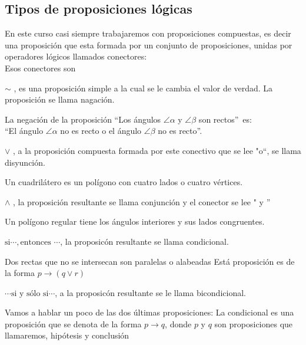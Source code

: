 \subsection{Tipos de proposiciones lógicas}
En este curso casi siempre trabajaremos con proposiciones compuestas, es decir
una proposici\'on que esta formada por un conjunto de proposiciones, unidas por
operadores l\'ogicos llamados conectores:\\ Esos conectores son
\begin{lista}
\item $\sim$ , es una proposici\'on simple a la cual se le cambia el valor de
verdad. La proposici\'on se llama nagaci\'on.
\setlength{\parindent}{-25pt}
\begin{ejemplo}{La negación de la proposición \textquotedblleft Los ángulos
$\angle\alpha$ y $\angle\beta$ son rectos\textquotedblright\, es:\\
\textquotedblleft El ángulo $\angle\alpha$ no es recto o el ángulo
$\angle\beta$ no es recto\textquotedblright.}
\end{ejemplo}
 \item $\vee$ , a la proposici\'on compuesta formada por este conectivo que se
lee "o``, se llama disyunci\'on.
\begin{ejemplo}{
 Un cuadril\'atero es un polígono con cuatro lados o cuatro v\'ertices.}
\end{ejemplo}

\item $\wedge$ , la proposici\'on resultante se llama conjunci\'on y el conector
se lee " y ''
\begin{ejemplo}{Un polígono regular tiene los ángulos interiores y sus lados
congruentes.}
 \end{ejemplo}
\item $ \mbox{si}\cdots , \mbox{entonces } \cdots$, la proposic\'on resultante
se llama condicional.
\begin{ejemplo}{Dos rectas que no se intersecan son paralelas o alabeadas}
 Est\'a proposición es de la forma $p \rightarrow \left( q \vee r\right) $
\end{ejemplo}
\item $\cdots \mbox{si y s\'olo si} \cdots$, a la proposic\'on resultante se le
llama bicondicional.
\end{lista}
Vamos a hablar un poco de las dos \'ultimas proposiciones:
La condicional es una proposici\'on que se denota de la forma $p\longrightarrow
q$, donde $p$ y $q$ son proposiciones que llamaremos, hip\'otesis y conclusi\'on
